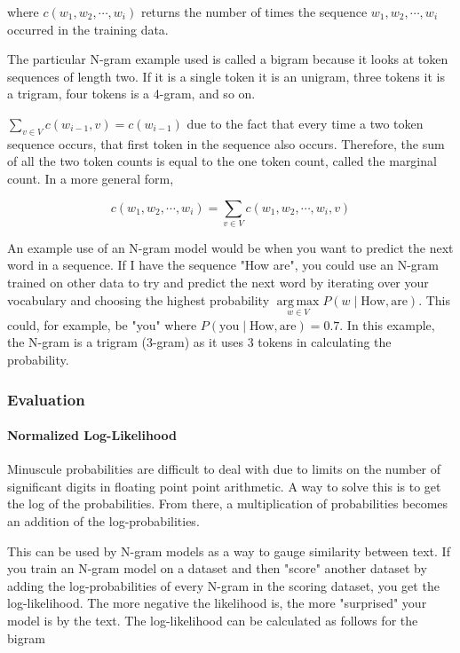 \documentclass[11pt]{article}
\DeclareMathOperator*{\argmax}{arg\,max}
\begin{document}
where $c \left( w_1, w_2, \cdots, w_i \right)$ returns the number of times the sequence $w_1, w_2, \cdots, w_i$ occurred in the training data.

The particular N-gram example used is called a bigram because it looks at token sequences of length two. If it is a single token it is an unigram, three tokens it is a trigram, four tokens is a 4-gram, and so on.

$\sum\limits_{v \in V} c\left( w_{i-1}, v \right) = c\left( w_{i-1}\right)$ due to the fact that every time a two token sequence occurs, that first token in the sequence also occurs. Therefore, the sum of all the two token counts is equal to the one token count, called the marginal count. In a more general form,

$$ c\left(w_1, w_2, \cdots, w_i\right) =  \sum\limits_{v \in V} c\left(w_1, w_2, \cdots, w_i, v\right) $$

An example use of an N-gram model would be when you want to predict the next word in a sequence. If I have the sequence "How are", you could use an N-gram trained on other data to try and predict the next word by iterating over your vocabulary and choosing the highest probability $\argmax\limits_{w \in V} P\left( w \; \vert \; \text{How}, \text{are} \right)$. This could, for example, be "you" where $P\left( \text{you} \; \vert \; \text{How}, \text{are} \right) = 0.7$. In this example, the N-gram is a trigram (3-gram) as it uses 3 tokens in calculating the probability.

\subsubsection{Evaluation}

\paragraph{Normalized Log-Likelihood}

Minuscule probabilities are difficult to deal with due to limits on the number of significant digits in floating point point arithmetic. A way to solve this is to get the log of the probabilities. From there, a multiplication of probabilities becomes an addition of the log-probabilities.

This can be used by N-gram models as a way to gauge similarity between text. If you train an N-gram model on a dataset and then "score" another dataset by adding the log-probabilities of every N-gram in the scoring dataset, you get the log-likelihood. The more negative the likelihood is, the more "surprised" your model is by the text. The log-likelihood can be calculated as follows for the bigram
\end{document}
